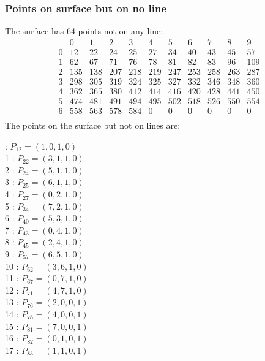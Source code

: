 \documentclass{article}
\begin{document}
{\subsubsection*{Points on surface but on no line}
The surface has 64 points not on any line:\\
$$
\begin{array}{r|*{10}{r}}
 & 0 & 1 & 2 & 3 & 4 & 5 & 6 & 7 & 8 & 9\\
\hline
0 & 12 & 22 & 24 & 25 & 27 & 34 & 40 & 43 & 45 & 57\\
1 & 62 & 67 & 71 & 76 & 78 & 81 & 82 & 83 & 96 & 109\\
2 & 135 & 138 & 207 & 218 & 219 & 247 & 253 & 258 & 263 & 287\\
3 & 298 & 305 & 319 & 324 & 325 & 327 & 332 & 346 & 348 & 360\\
4 & 362 & 365 & 380 & 412 & 414 & 416 & 420 & 428 & 441 & 450\\
5 & 474 & 481 & 491 & 494 & 495 & 502 & 518 & 526 & 550 & 554\\
6 & 558 & 563 & 578 & 584 & 0 & 0 & 0 & 0 & 0 & 0\\
\end{array}
$$
The points on the surface but not on lines are:\\
\begin{multicols}{2}
 : $P_{12}=( 1, 0, 1, 0 )$\\
1 : $P_{22}=( 3, 1, 1, 0 )$\\
2 : $P_{24}=( 5, 1, 1, 0 )$\\
3 : $P_{25}=( 6, 1, 1, 0 )$\\
4 : $P_{27}=( 0, 2, 1, 0 )$\\
5 : $P_{34}=( 7, 2, 1, 0 )$\\
6 : $P_{40}=( 5, 3, 1, 0 )$\\
7 : $P_{43}=( 0, 4, 1, 0 )$\\
8 : $P_{45}=( 2, 4, 1, 0 )$\\
9 : $P_{57}=( 6, 5, 1, 0 )$\\
10 : $P_{62}=( 3, 6, 1, 0 )$\\
11 : $P_{67}=( 0, 7, 1, 0 )$\\
12 : $P_{71}=( 4, 7, 1, 0 )$\\
13 : $P_{76}=( 2, 0, 0, 1 )$\\
14 : $P_{78}=( 4, 0, 0, 1 )$\\
15 : $P_{81}=( 7, 0, 0, 1 )$\\
16 : $P_{82}=( 0, 1, 0, 1 )$\\
17 : $P_{83}=( 1, 1, 0, 1 )$\\

\end{multicols}}
\end{document}
